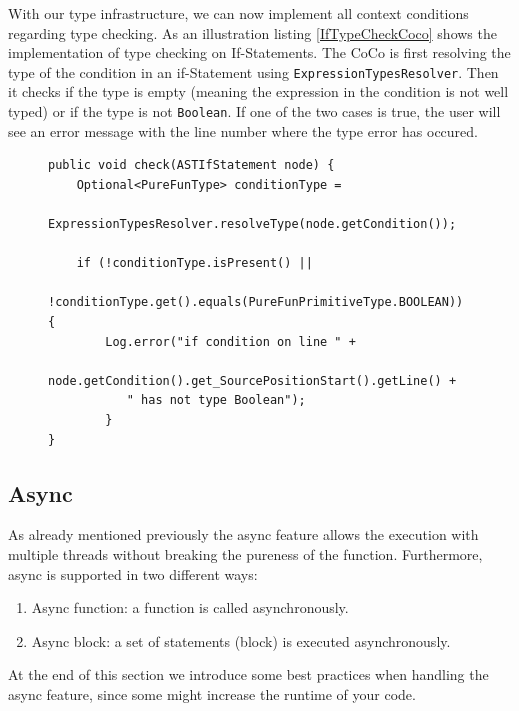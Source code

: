 With our type infrastructure, we can now implement all context conditions regarding type checking. As an illustration listing \ref{IfTypeCheckCoco} shows the implementation of type checking on If-Statements. The CoCo is first resolving the type of the condition in an if-Statement using \texttt{ExpressionTypesResolver}. Then it checks if the type is empty (meaning the expression in the condition is not well typed) or if the type is not \texttt{Boolean}. If one of the two cases is true, the user will see an error message with the line number where the type error has occured.

\begin{figure}[h]
\begin{lstlisting}[caption={Implementation of If-Statement type checking CoCo},label={IfTypeCheckCoco}]
public void check(ASTIfStatement node) {
    Optional<PureFunType> conditionType =
       	ExpressionTypesResolver.resolveType(node.getCondition());

    if (!conditionType.isPresent() ||
        	!conditionType.get().equals(PureFunPrimitiveType.BOOLEAN)) {
        Log.error("if condition on line " + 
           node.getCondition().get_SourcePositionStart().getLine() + 
           " has not type Boolean");
        }
}
\end{lstlisting}
\end{figure}

\subsection{Async}
As already mentioned previously the async feature allows the execution with multiple threads without breaking the pureness of the function. Furthermore, async is supported in two different ways:

\begin{enumerate}
\item Async function: a function is called asynchronously.
\item Async block: a set of statements (block) is executed asynchronously.
\end{enumerate}
At the end of this section we introduce some best practices when handling the async feature, since some might increase the runtime of your code.
